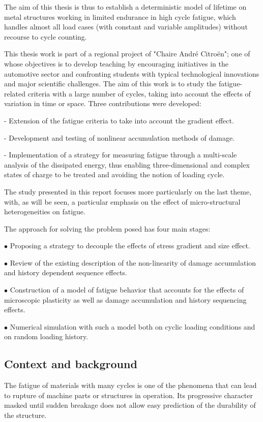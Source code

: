 The aim of this thesis is thus to establish a deterministic model of lifetime
on metal structures working in limited endurance in high cycle fatigue, which handles almost all load cases
(with constant and variable amplitudes) without recourse to cycle counting.

This thesis work is part of a regional project of "Chaire André Citroën"; one of whose objectives is to develop teaching by encouraging initiatives in the automotive sector and confronting students with typical technological innovations and major scientific challenges. The aim of this work is to study the fatigue-related criteria with a large number of cycles, taking into account the effects of variation in time or space. Three contributions were developed:

- Extension of the fatigue criteria to take into account the gradient effect.

- Development and testing of nonlinear accumulation methods of damage.

- Implementation of a strategy for measuring fatigue through a multi-scale analysis of the dissipated energy, thus enabling three-dimensional and complex states of charge to be treated and avoiding the notion of loading cycle.

The study presented in this report focuses more particularly on the last theme, with, as will be seen, a particular emphasis on the effect of micro-structural heterogeneities on fatigue.



The approach for solving the problem posed has four main stages:

$\bullet$ Proposing a strategy to decouple the effects of stress gradient and size effect.

$\bullet$ Review of the existing description of the non-linearity of damage accumulation and history dependent sequence effects.

$\bullet$ Construction of a model of fatigue behavior that accounts for the effects of
microscopic plasticity as well as damage accumulation and history sequencing effects. 

$\bullet$ Numerical simulation with such a model both on cyclic loading conditions and on random loading history.




\subsection{Context and background}
The fatigue of materials with many cycles is one of the phenomena that can lead to
rupture of machine parts or structures in operation. Its progressive character
masked until sudden breakage does not allow easy prediction of the durability of the
structure.

